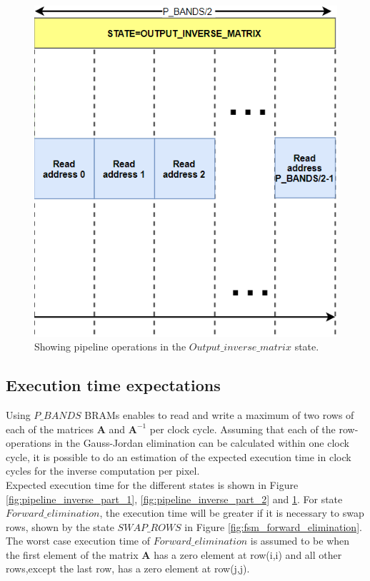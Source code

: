 \begin{figure}[H]
\centering
   \includegraphics[scale=0.5]{images/estimation_execution_time/pipeline_inverse_matrix_part_3.PNG}
  \caption{Showing pipeline operations in the $Output\_inverse\_matrix$ state.  } 
  \label{fig:pipeline_inverse_part_3}
\end{figure}



\subsection{Execution time expectations}
Using $P\_BANDS$ BRAMs enables to read and write a maximum of two rows of each of the matrices $\textbf{A}$ and $\textbf{A}^{-1}$ per clock cycle.  Assuming that each of the row-operations in the Gauss-Jordan elimination can be calculated within one clock cycle, it is possible to do an estimation of the expected execution time in clock cycles for the inverse computation per pixel. \\

Expected execution time for the different states is shown in Figure \ref{fig:pipeline_inverse_part_1}, \ref{fig:pipeline_inverse_part_2} and \ref{fig:pipeline_inverse_part_3}. For state $Forward\_elimination$, the execution time will be greater if it is necessary to swap rows, shown by the state $SWAP\_ROWS$ in Figure \ref{fig:fsm_forward_elimination}. The worst case execution time of $Forward\_elimination$ is assumed to be when the first element of the matrix $\textbf{A}$ has a zero element at row(i,i) and all other rows,except the last row, has a zero element at row(j,j). \\

